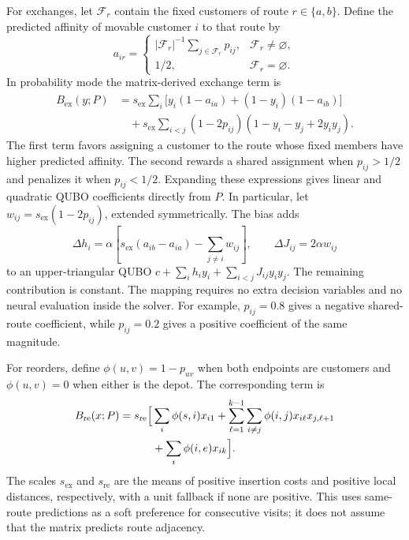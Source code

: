 \documentclass[11pt,a4paper]{article}
\begin{document}
For exchanges, let $\mathcal{F}_r$ contain the fixed customers of route
$r\in\{a,b\}$. Define the predicted affinity of movable customer $i$ to
that route by
\begin{equation}
 a_{ir}=\begin{cases}
 |\mathcal{F}_r|^{-1}\displaystyle\sum_{j\in\mathcal{F}_r}p_{ij},
       &\mathcal{F}_r\ne\varnothing,\\
 1/2, &\mathcal{F}_r=\varnothing.
 \end{cases}
\end{equation}
In probability mode the matrix-derived exchange term is
\begin{align}
 B_{\mathrm{ex}}(y;P)
 &=s_{\mathrm{ex}}\sum_i
       \bigl[y_i(1-a_{ia})+(1-y_i)(1-a_{ib})\bigr] \nonumber\\
 &\quad+s_{\mathrm{ex}}\sum_{i<j}(1-2p_{ij})
       (1-y_i-y_j+2y_iy_j).
 \label{eq:matrix-exchange}
\end{align}
The first term favors assigning a customer to the route whose fixed members
have higher predicted affinity. The second rewards a shared assignment when
$p_{ij}>1/2$ and penalizes it when $p_{ij}<1/2$. Expanding these expressions
gives linear and quadratic QUBO coefficients directly from $P$.
In particular, let $w_{ij}=s_{\mathrm{ex}}(1-2p_{ij})$, extended
symmetrically. The bias adds
\begin{equation}
 \Delta h_i=\alpha\left[s_{\mathrm{ex}}(a_{ib}-a_{ia})
                   -\sum_{j\ne i}w_{ij}\right],
 \qquad \Delta J_{ij}=2\alpha w_{ij}
 \label{eq:bias-coefficients}
\end{equation}
to an upper-triangular QUBO
$c+\sum_i h_i y_i+\sum_{i<j}J_{ij}y_iy_j$. The remaining contribution
is constant. The mapping requires no extra decision variables and no
neural evaluation inside the solver. For example, $p_{ij}=0.8$ gives
a negative shared-route coefficient, while $p_{ij}=0.2$ gives a positive
coefficient of the same magnitude.

For reorders, define $\phi(u,v)=1-p_{uv}$ when both endpoints are customers
and $\phi(u,v)=0$ when either is the depot. The corresponding term is
\begin{align}
 B_{\mathrm{re}}(x;P)=s_{\mathrm{re}}\Bigl[
 &\sum_i\phi(s,i)x_{i1}
 +\sum_{\ell=1}^{k-1}\sum_{i\ne j}\phi(i,j)x_{i\ell}x_{j,\ell+1}
 \nonumber\\
 &+\sum_i\phi(i,e)x_{ik}\Bigr].
 \label{eq:matrix-reorder}
\end{align}
The scales $s_{\mathrm{ex}}$ and $s_{\mathrm{re}}$ are the means of positive
insertion costs and positive local distances, respectively, with a unit
fallback if none are positive. This uses same-route predictions as a soft
preference for consecutive visits; it does not assume that the matrix
predicts route adjacency.
\end{document}
